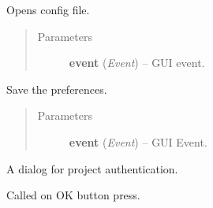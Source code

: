 \documentclass[letterpaper,10pt,english]{sphinxmanual}
\begin{document}
\begin{fulllineitems}
\begin{fulllineitems}
\begin{quote}
\begin{description}
\end{description}\end{quote}

\end{fulllineitems}


\begin{fulllineitems}
\label{dialogs:dialogs.PreferencesDialog.ReloadConfig}
Opens config file.
\begin{quote}\begin{description}
\item[{Parameters}] \leavevmode
\textbf{event} (\emph{Event}) -- GUI event.

\end{description}\end{quote}

\end{fulllineitems}


\begin{fulllineitems}
\label{dialogs:dialogs.PreferencesDialog.SavePreferences}
Save the preferences.
\begin{quote}\begin{description}
\item[{Parameters}] \leavevmode
\textbf{event} (\emph{Event}) -- GUI Event.

\end{description}\end{quote}

\end{fulllineitems}


\end{fulllineitems}


\begin{fulllineitems}
\label{dialogs:dialogs.ProjectAuthenticationDialog}
A dialog for project authentication.

\begin{fulllineitems}
\label{dialogs:dialogs.ProjectAuthenticationDialog.OnOk}
Called on OK button press.

\end{fulllineitems}


\end{fulllineitems}
\end{document}
